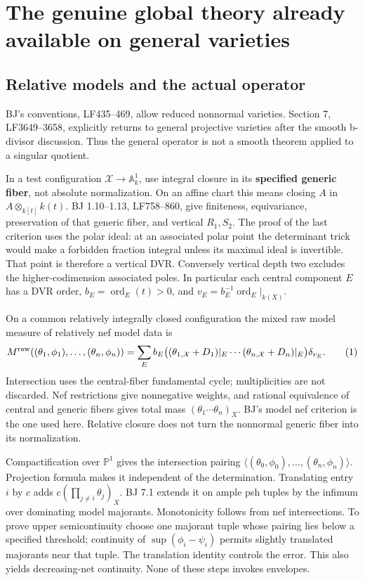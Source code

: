\documentclass[
  11pt,
]{article}
\begin{document}
\section{The genuine global theory already available on general
varieties}\label{the-genuine-global-theory-already-available-on-general-varieties}

\subsection{Relative models and the actual
operator}\label{relative-models-and-the-actual-operator}

BJ's conventions, LF435--469, allow reduced nonnormal varieties. Section
7, LF3649--3658, explicitly returns to general projective varieties
after the smooth b-divisor discussion. Thus the general operator is not
a smooth theorem applied to a singular quotient.

In a test configuration \(\mathcal X\to\mathbb A^1_k\), use integral
closure in its \textbf{specified generic fiber}, not absolute
normalization. On an affine chart this means closing \(A\) in
\(A\otimes_{k[t]}k(t)\). BJ 1.10--1.13, LF758--860, give finiteness,
equivariance, preservation of that generic fiber, and vertical
\(R_1,S_2\). The proof of the last criterion uses the polar ideal: at an
associated polar point the determinant trick would make a forbidden
fraction integral unless its maximal ideal is invertible. That point is
therefore a vertical DVR. Conversely vertical depth two excludes the
higher-codimension associated poles. In particular each central
component \(E\) has a DVR order, \(b_E=\operatorname{ord}_E(t)>0\), and
\(v_E=b_E^{-1}\operatorname{ord}_E|_{k(X)}\).

On a common relatively integrally closed configuration the mixed raw
model measure of relatively nef model data is \[
 M^{\rm raw}((\theta_1,\phi_1),\ldots,(\theta_n,\phi_n))
 =\sum_E b_E\bigl((\theta_{1,\mathcal X}+D_1)|_E\cdots
                  (\theta_{n,\mathcal X}+D_n)|_E\bigr)\delta_{v_E}.
 \tag{1}
\] Intersection uses the central-fiber fundamental cycle; multiplicities
are not discarded. Nef restrictions give nonnegative weights, and
rational equivalence of central and generic fibers gives total mass
\((\theta_1\cdots\theta_n)_X\). BJ's model nef criterion is the one used
here. Relative closure does not turn the nonnormal generic fiber into
its normalization.

Compactification over \(\mathbb P^1\) gives the intersection pairing
\(\langle(\theta_0,\phi_0),\ldots,(\theta_n,\phi_n)\rangle\). Projection
formula makes it independent of the determination. Translating entry
\(i\) by \(c\) adds \(c(\prod_{j\ne i}\theta_j)_X\). BJ 7.1 extends it
on ample psh tuples by the infimum over dominating model majorants.
Monotonicity follows from nef intersections. To prove upper
semicontinuity choose one majorant tuple whose pairing lies below a
specified threshold; continuity of \(\sup(\phi_i-\psi_i)\) permits
slightly translated majorants near that tuple. The translation identity
controls the error. This also yields decreasing-net continuity. None of
these steps invokes envelopes.
\end{document}
